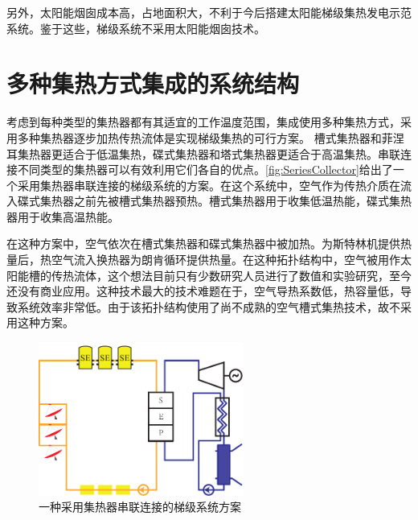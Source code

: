 另外，太阳能烟囱成本高，占地面积大，不利于今后搭建太阳能梯级集热发电示范系统。鉴于这些，梯级系统不采用太阳能烟囱技术。

\section{多种集热方式集成的系统结构}
\label{sec:csc}
考虑到每种类型的集热器都有其适宜的工作温度范围，集成使用多种集热方式，采用多种集热器逐步加热传热流体是实现梯级集热的可行方案。
槽式集热器和菲涅耳集热器更适合于低温集热，碟式集热器和塔式集热器更适合于高温集热。串联连接不同类型的集热器可以有效利用它们各自的优点。\autoref{fig:SeriesCollector}给出了一个采用集热器串联连接的梯级系统的方案。在这个系统中，空气作为传热介质在流入碟式集热器之前先被槽式集热器预热。槽式集热器用于收集低温热能，碟式集热器用于收集高温热能。

在这种方案中，空气依次在槽式集热器和碟式集热器中被加热。为斯特林机提供热量后，热空气流入换热器为朗肯循环提供热量。在这种拓扑结构中，空气被用作太阳能槽的传热流体，这个想法目前只有少数研究人员进行了数值和实验研究，至今还没有商业应用\cite{Good2015,Good2016}。这种技术最大的技术难题在于，空气导热系数低，热容量低，导致系统效率非常低。由于该拓扑结构使用了尚不成熟的空气槽式集热技术，故不采用这种方案。
\begin{figure}[ht!]
\centering 
\includegraphics[width=0.6\textwidth]{fig/SeriesCollector}
\caption{一种采用集热器串联连接的梯级系统方案}\label{fig:SeriesCollector}
\end{figure}

